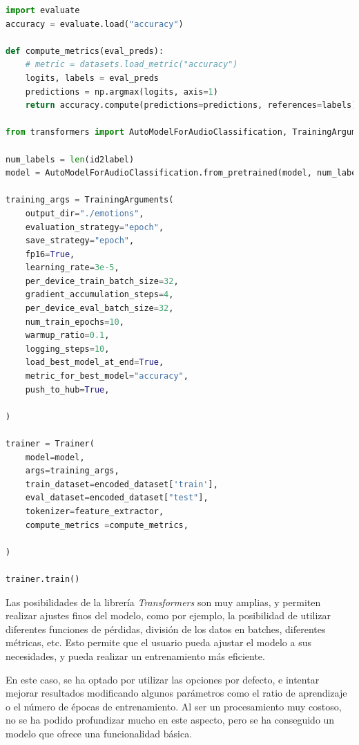 \begin{lstlisting}[language=Python, caption=Entrenamiento del modelo, label={code:train-model}]
import evaluate
accuracy = evaluate.load("accuracy")

def compute_metrics(eval_preds):
    # metric = datasets.load_metric("accuracy")
    logits, labels = eval_preds
    predictions = np.argmax(logits, axis=1)
    return accuracy.compute(predictions=predictions, references=labels)

from transformers import AutoModelForAudioClassification, TrainingArguments, Trainer

num_labels = len(id2label)
model = AutoModelForAudioClassification.from_pretrained(model, num_labels=num_labels, label2id=label2id, id2label=id2label)

training_args = TrainingArguments(
    output_dir="./emotions",
    evaluation_strategy="epoch",
    save_strategy="epoch",
    fp16=True,
    learning_rate=3e-5,
    per_device_train_batch_size=32,
    gradient_accumulation_steps=4,
    per_device_eval_batch_size=32,
    num_train_epochs=10,
    warmup_ratio=0.1,
    logging_steps=10,
    load_best_model_at_end=True,
    metric_for_best_model="accuracy",
    push_to_hub=True,

)

trainer = Trainer(
    model=model,
    args=training_args,
    train_dataset=encoded_dataset['train'],
    eval_dataset=encoded_dataset["test"],
    tokenizer=feature_extractor,
    compute_metrics =compute_metrics,

)

trainer.train()

\end{lstlisting}


Las posibilidades de la librería \textit{Transformers} son muy amplias, y permiten realizar ajustes finos del modelo, como por ejemplo, la posibilidad de utilizar diferentes funciones de pérdidas, división de los datos en batches, diferentes métricas, etc.
Esto permite que el usuario pueda ajustar el modelo a sus necesidades, y pueda realizar un entrenamiento más eficiente.

En este caso, se ha optado por utilizar las opciones por defecto, e intentar mejorar resultados modificando algunos parámetros como el ratio de aprendizaje o el número de épocas de entrenamiento.
Al ser un procesamiento muy costoso, no se ha podido profundizar mucho en este aspecto, pero se ha conseguido un modelo que ofrece una funcionalidad básica.

